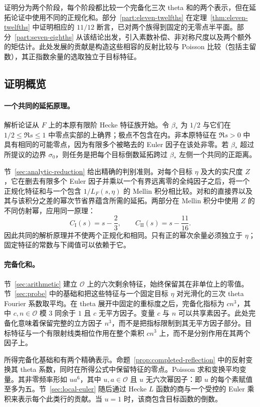 \documentclass[11pt,a4paper]{article}
\numberwithin{equation}{section}
\numberwithin{figure}{section}
\theoremstyle{definition}
\theoremstyle{remark}
\begin{document}
证明分为两个阶段，每个阶段都比较一个完备化三次 theta 和的两个表示，但在延拓论证中使用不同的正规化和。部分~\ref{part:eleven-twelfths} 在定理~\ref{thm:eleven-twelfths} 中证明相应的 $11/12$ 断言，已对两个族得到固定的无零点半平面。部分~\ref{part:seven-eighths} 从该结论出发，引入素数补偿、非对称尺度以及两个额外的矩估计。此处发展的贡献是构造这些相容的反射比较与 Poisson 比较（包括主留数），其正指数余量的选取独立于目标特征。

\subsection*{证明概览}

\paragraph{一个共同的延拓原理。}
解析论证从 $F$ 上的本原有限阶 Hecke 特征族开始。令 $\beta_*$ 为 $1/2$ 与它们在 $1/2\le\Re s\le1$ 中零点实部的上确界；极点不包含在内。非本原特征在 $\Re s>0$ 中具有相同的可能零点，因为有限多个被略去的 Euler 因子在该处非零。若 $\beta_*$ 超过所提议的边界 $\sigma_0$，则任务是把每个目标倒数延拓跨过 $\beta_*$ 左侧一个共同的正距离。

节~\ref{sec:analytic-reduction} 给出精确的判别准则。对每个目标 $\eta$ 及大的实尺度 $Z$，它在删去有限多个 Euler 因子并乘以一个有界远离零的全纯因子之后，将一个正规化特征和与一个包含 $1/L_F(s,\eta)$ 的 Mellin 积分相比较。对和的直接界以及其与该积分之差的幂次节省界蕴含所需的延拓。两部分在 Mellin 积分中使用 $Z$ 的不同仿射幂，应用同一原理：
\[
 C_{\mathrm I}(s)=s-\frac23,\qquad
 C_{\mathrm{II}}(s)=s-\frac{11}{16}.
\]
因此共同的解析原理并不使两个正规化和相同。只有正的幂次余量必须独立于 $\eta$；固定特征的常数与下阈值可以依赖于它。

\paragraph{完备化和。}
节~\ref{sec:arithmetic} 建立 $\mathcal O$ 上的六次剩余特征，始终保留其在非单位上的零值。节~\ref{sec:probe} 中的基础和把这些特征与一个固定目标 $\eta$ 对光滑化的三次 theta Fourier 系数取平均。在 theta 展开中固定的重标度之后，完备化指标为 $cn^3$，其中 $c,n\in\mathcal O$ 模 $3$ 同余于 $1$ 且 $c$ 无平方因子。变量 $c$ 与 $n$ 可以共享素因子。此处完备化意味着保留完整的立方因子 $n^3$，而不是把指标限制到其无平方因子部分。目标特征与一个有限射线类相位作用在整个乘积 $cn^3$ 上，而不是分别作用在其两个因子上。

所得完备化基础和有两个精确表示。命题~\ref{prop:completed-reflection} 中的反射变换其 theta 系数，同时在所得公式中保留特征的零点。Poisson 求和变换平均变量。其非零频率形如 $ua^6$，其中 $u,a\in\mathcal O$ 且 $u$ 无六次幂因子：即 $u$ 的每个素赋值至多为五。节~\ref{sec:local-euler} 随后通过 Hecke $L$ 函数的商与一个受控的 Euler 乘积来表示每个此类行的贡献。当 $u=1$ 时，该商包含目标函数的倒数。
\end{document}
